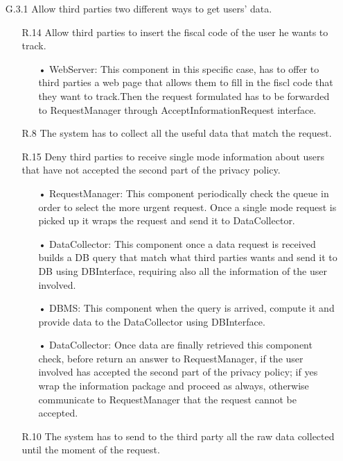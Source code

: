 \begin{enumerate}
\item [G.3.1] Allow third parties two different ways to get users’ data.
	\begin{enumerate}
	\item [R.14] Allow third parties to insert the fiscal code of the user he wants to track.
		\begin{enumerate}
		\item[•] WebServer: This component in this specific case, has to offer to third parties a web page that allows them to fill in the fiscl code that they want to track.Then the request formulated has to be forwarded to RequestManager through AcceptInformationRequest interface.
		\end{enumerate}	
		
	\item [R.8] The system has to collect all the useful data that match the request.
	\item [R.15] Deny third parties to receive single mode information about users that have not accepted the second part of the privacy policy.
		\begin{enumerate}
		\item[•] RequestManager: This component periodically check the queue in order to select the more urgent request. Once a single mode request is picked up it wraps the request and send it to DataCollector.
		\item[•] DataCollector: This component once a data request is received builds a DB query that match what third parties wants and send it to DB using DBInterface, requiring also all the information of the user involved.
		\item[•] DBMS: This component when the query is arrived, compute it and provide data to the DataCollector using DBInterface.
		\item[•] DataCollector: Once data are finally retrieved this component check, before return an answer to RequestManager, if the user involved has accepted the second part of the privacy policy; if yes wrap the information package and proceed as always, otherwise communicate to RequestManager that the request cannot be accepted.
		\end{enumerate}	
		
	\item [R.10] The system has to send to the third party all the raw data collected until the moment of the request.
	\end{enumerate}
	

\end{enumerate}
